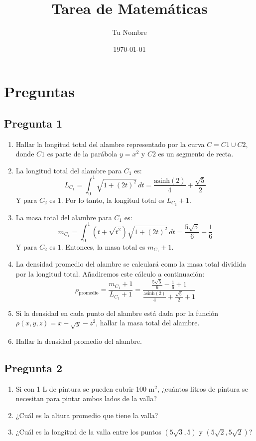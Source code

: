 \documentclass{article}
\begin{document}
\title{Tarea de Matemáticas}
\author{Tu Nombre}
\date{\today}
\maketitle

\section*{Preguntas}

\subsection*{Pregunta 1}
\begin{enumerate}
    \item Hallar la longitud total del alambre representado por la curva \( C = C1 \cup C2 \), donde \( C1 \) es parte de la parábola \( y = x^2 \) y \( C2 \) es un segmento de recta.
    \item La longitud total del alambre para \( C_1 \) es:
    \[
    L_{C_1} = \int_{0}^{1} \sqrt{1 + (2t)^2} \, dt = \frac{\text{asinh}(2)}{4} + \frac{\sqrt{5}}{2}
    \]
    Y para \( C_2 \) es \( 1 \). Por lo tanto, la longitud total es \( L_{C_1} + 1 \).
    
    \item La masa total del alambre para \( C_1 \) es:
    \[
    m_{C_1} = \int_{0}^{1} (t + \sqrt{t^2}) \sqrt{1 + (2t)^2} \, dt = \frac{5\sqrt{5}}{6} - \frac{1}{6}
    \]
    Y para \( C_2 \) es \( 1 \). Entonces, la masa total es \( m_{C_1} + 1 \).
    
    \item La densidad promedio del alambre se calculará como la masa total dividida por la longitud total. Añadiremos este cálculo a continuación:
    \[
    \rho_{\text{promedio}} = \frac{m_{C_1} + 1}{L_{C_1} + 1} = \frac{\frac{5\sqrt{5}}{6} - \frac{1}{6} + 1}{\frac{\text{asinh}(2)}{4} + \frac{\sqrt{5}}{2} + 1}
    \]
    \item Si la densidad en cada punto del alambre está dada por la función \( \rho(x, y, z) = x + \sqrt{y} - z^2 \), hallar la masa total del alambre.
    \item Hallar la densidad promedio del alambre.
\end{enumerate}

\subsection*{Pregunta 2}
\begin{enumerate}
    \item Si con 1 L de pintura se pueden cubrir 100 m\(^2\), ¿cuántos litros de pintura se necesitan para pintar ambos lados de la valla?
    \item ¿Cuál es la altura promedio que tiene la valla?
    \item ¿Cuál es la longitud de la valla entre los puntos \( (5\sqrt{3}, 5) \) y \( (5\sqrt{2}, 5\sqrt{2}) \)?
\end{enumerate}
\end{document}
